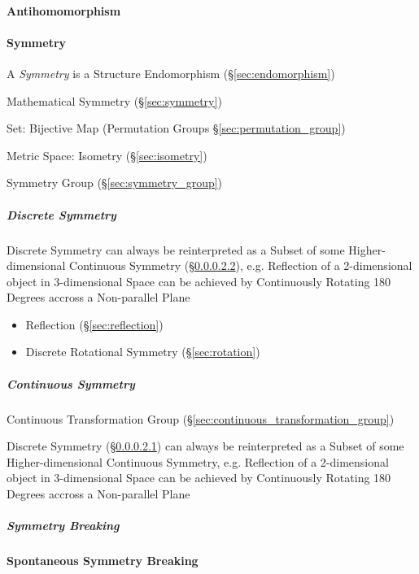 \paragraph{Antihomomorphism}\label{sec:antihomomorphism}\hfill

\paragraph{Symmetry}\label{sec:structure_symmetry}\hfill

A \emph{Symmetry} is a Structure Endomorphism (\S\ref{sec:endomorphism})

Mathematical Symmetry (\S\ref{sec:symmetry})

Set: Bijective Map (Permutation Groups \S\ref{sec:permutation_group})

Metric Space: Isometry (\S\ref{sec:isometry})

Symmetry Group (\S\ref{sec:symmetry_group})



\subparagraph{Discrete Symmetry}\label{sec:discrete_symmetry}\hfill

Discrete Symmetry can always be reinterpreted as a Subset of some
Higher-dimensional Continuous Symmetry (\S\ref{sec:continuous_symmetry}), e.g.
Reflection of a 2-dimensional object in 3-dimensional Space can be achieved by
Continuously Rotating 180 Degrees accross a Non-parallel Plane

\begin{itemize}
  \item Reflection (\S\ref{sec:reflection})
  \item Discrete Rotational Symmetry (\S\ref{sec:rotation})
\end{itemize}



\subparagraph{Continuous Symmetry}\label{sec:continuous_symmetry}\hfill

Continuous Transformation Group
(\S\ref{sec:continuous_transformation_group})

Discrete Symmetry (\S\ref{sec:discrete_symmetry}) can always be reinterpreted as
a Subset of some Higher-dimensional Continuous Symmetry, e.g. Reflection of a
2-dimensional object in 3-dimensional Space can be achieved by Continuously
Rotating 180 Degrees accross a Non-parallel Plane



\subparagraph{Symmetry Breaking}\label{sec:symmetry_breaking}\hfill

\textbf{Spontaneous Symmetry Breaking}



